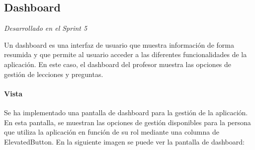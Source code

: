 \subsection{Dashboard}

\textit{Desarrollado en el Sprint 5}
\label{sec:dashboard}

Un dashboard es una interfaz de usuario que muestra información de forma resumida y que permite al usuario acceder a las diferentes funcionalidades de la aplicación.
 En este caso, el dashboard del profesor muestra las opciones de gestión de lecciones y preguntas.

\paragraph*{Vista}
Se ha implementado una pantalla de dashboard para la gestión de la aplicación.
En esta pantalla, se muestran las opciones de gestión disponibles para la persona que utiliza la aplicación en función de su rol mediante una columna de ElevatedButton.
 En la siguiente imagen se puede ver la pantalla de dashboard:



